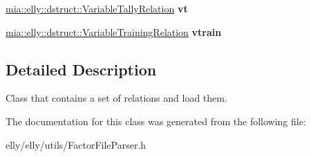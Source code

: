 \begin{DoxyCompactItemize}
\item 
\hypertarget{classmia_1_1elly_1_1utils_1_1_factor_file_parser_a6b0fe25be1e5144f853cd86da9876ecf}{\hyperlink{classmia_1_1elly_1_1dstruct_1_1_variable_tally_relation}{mia\-::elly\-::dstruct\-::\-Variable\-Tally\-Relation} {\bfseries vt}}\label{classmia_1_1elly_1_1utils_1_1_factor_file_parser_a6b0fe25be1e5144f853cd86da9876ecf}

\item 
\hypertarget{classmia_1_1elly_1_1utils_1_1_factor_file_parser_a0e81f19fe8c5c0532273f12b4028b769}{\hyperlink{classmia_1_1elly_1_1dstruct_1_1_variable_training_relation}{mia\-::elly\-::dstruct\-::\-Variable\-Training\-Relation} {\bfseries vtrain}}\label{classmia_1_1elly_1_1utils_1_1_factor_file_parser_a0e81f19fe8c5c0532273f12b4028b769}

\end{DoxyCompactItemize}


\subsection{Detailed Description}
Class that contains a set of relations and load them. 

The documentation for this class was generated from the following file\-:\begin{DoxyCompactItemize}
\item 
elly/elly/utils/Factor\-File\-Parser.\-h\end{DoxyCompactItemize}
